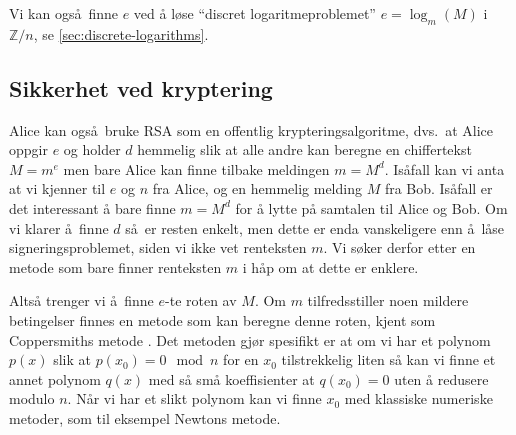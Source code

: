 Vi kan også finne $e$ ved å løse ``discret logaritmeproblemet'' $e = \log_{m}(M)$
i $\mathbb Z / n$,
se \cref{sec:discrete-logarithms}.

\subsection{Sikkerhet ved kryptering}

Alice kan også bruke RSA som en offentlig krypteringsalgoritme,
dvs.\ at Alice oppgir $e$ og holder $d$ hemmelig slik at alle andre
kan beregne en chiffertekst $M = m^e$ men bare Alice kan finne tilbake meldingen
$m = M^d$.
Isåfall kan vi anta at vi kjenner til $e$ og $n$ fra Alice,
og en hemmelig melding $M$ fra Bob.
Isåfall er det interessant å bare finne $m = M^d$ for å lytte på samtalen til
Alice og Bob.
Om vi klarer å finne $d$ så er resten enkelt,
men dette er enda vanskeligere enn å låse signeringsproblemet,
siden vi ikke vet renteksten $m$.
Vi søker derfor etter en metode som bare finner renteksten $m$ i håp om at dette
er enklere.

Altså trenger vi å finne $e$-te roten av $M$.
Om $m$ tilfredsstiller noen mildere betingelser finnes en
metode som kan beregne denne roten, kjent som Coppersmiths metode
\cite{coppersmith_finding_1996}.
Det metoden gjør spesifikt er at om vi har et polynom $p(x)$
slik at $p(x_0) = 0 \mod n$ for en $x_0$ tilstrekkelig liten
så kan vi finne et annet polynom $q(x)$ med så små koeffisienter
at $q(x_0) = 0$ uten å redusere modulo $n$.
Når vi har et slikt polynom kan vi finne $x_0$ med klassiske numeriske metoder,
som til eksempel Newtons metode.
